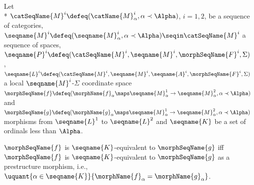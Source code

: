 \documentclass{article}
\begin{document}
\begin{definition}
\label{def:LCSmorphKequiv}
Let \\*
$\catSeqName{M}^i \defeq (\catName{M}^i_\alpha, \alpha \prec \Alpha)$,
$i =1,2$, be a sequence of categories,
$
  \seqname{M}^i \defeq (\seqname{M}^i_\alpha, \alpha \prec \Alpha)
  \seqin \catSeqName{M}^i
$
a sequence of spaces,
$
  \seqname{P}^i \defeq
  (
    \catSeqName{M}^i,
    \seqname{M}^i,
    \morphSeqName{F}^i,
    \Sigma
  )
$,
$
  \seqname{L}^i \defeq
  (
    \catSeqName{M}^i,
    \seqname{M}^i,
    \seqname{A}^i,
    \morphSeqName{F}^i,
    \Sigma
  )
$
a local $\seqname{M}^i$-$\Sigma$ coordinate space
$
  \morphSeqName{f} \defeq
    (
      \morphName{f}_\alpha \maps
        \seqname{M}^1_\alpha \to \seqname{M}^2_\alpha,
      \alpha \prec \Alpha
    )
$
and
$
  \morphSeqName{g} \defeq
    (
      \morphName{g}_\alpha \maps
        \seqname{M}^1_\alpha \to \seqname{M}^2_\alpha,
      \alpha \prec \Alpha
    )
$
morphisms from $\seqname{L}^1$ to $\seqname{L}^2$ and
$\seqname{K}$ be a set of ordinals less than $\Alpha$.

$\morphSeqName{f}$ is $\seqname{K}$-equivalent to $\morphSeqName{g}$ iff
$\morphSeqName{f}$ is $\seqname{K}$-equivalent to $\morphSeqName{g}$ as a
prestructure morphism, i.e.,
$
  \uquant
    {\alpha \in \seqname{K}}
    {\morphName{f}_\alpha = \morphName{g}_\alpha}
$.
\end{definition}
\end{document}
